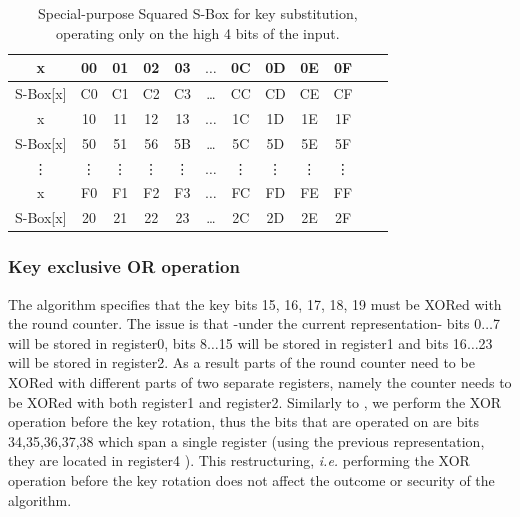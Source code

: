 \documentclass[11pt]{article}
\begin{document}
\begin{table}[h]
\footnotesize
\centering
\begin{tabular}{| c | c  | c | c | c  | c  | c | c | c  | c | c | c |}
\hline
  x & 00 & 01 & 02 & 03  &  $\dots$  & 0C & 0D & 0E & 0F   \\
\hline
 S-Box[x] & C0 & C1 & C2 & C3 & \dots & CC & CD & CE & CF   \\
\hline
  x & 10 & 11 & 12 & 13  &  $\dots$  & 1C & 1D & 1E & 1F   \\
\hline
 S-Box[x] & 50 & 51 & 56 & 5B & \dots & 5C & 5D & 5E & 5F   \\
\hline
  \vdots & \vdots & \vdots & \vdots & \vdots  &  $\dots$  & \vdots &\vdots & \vdots & \vdots   \\

\hline
  x & F0 & F1 & F2 & F3  &  $\dots$  & FC & FD & FE & FF   \\
\hline
 S-Box[x] & 20 & 21 & 22 & 23 & \dots & 2C & 2D & 2E & 2F   \\
\hline


\end{tabular}
 \caption{\footnotesize Special-purpose Squared S-Box for key substitution, operating only on the high 4 bits of the input.}
 \label{key_sbox}
\end{table}

\subsubsection{Key exclusive OR operation}
The algorithm specifies that the key bits 15, 16, 17, 18, 19 must be XORed with the round counter. The issue is that -under the current representation- bits 0$\dots$7 will be stored in register0, bits 8$\dots$15 will be stored in register1 and bits 16$\dots$23 will be stored in register2. As a result parts of the round counter need to be XORed with different parts of two separate registers, namely the counter needs to be XORed with both register1 and register2. Similarly to \cite{eisenbarth2012compact}, we perform the XOR operation before the key rotation, thus the bits that are operated on are bits 34,35,36,37,38 which span a single register (using the previous representation, they are located in register4 ). This restructuring, \emph{i.e.} performing the XOR operation before the key rotation does not affect the outcome or security of the algorithm. 


\end{document}
